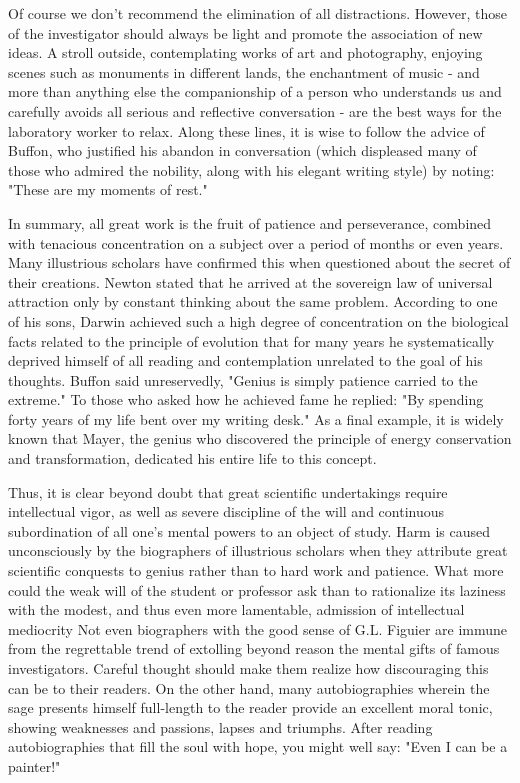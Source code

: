 \documentclass{article}
\begin{document}
Of course we don’t recommend the elimination of all distractions. However, those of the investigator should always be light and promote the association of new ideas. A stroll outside, contemplating works of art and photography, enjoying scenes such as monuments in different lands, the enchantment of music - and more than anything else the companionship of a person who understands us and carefully avoids all serious and reflective conversation - are the best ways for the laboratory worker to relax. Along these lines, it is wise to follow the advice of Buffon, who justified his abandon in conversation (which displeased many of those who admired the nobility, along with his elegant writing style) by noting: "These are my moments of rest."

In summary, all great work is the fruit of patience and perseverance, combined with tenacious concentration on a subject over a period of months or even years. Many illustrious scholars have confirmed this when questioned about the secret of their creations. Newton stated that he arrived at the sovereign law of universal attraction only by constant thinking about the same problem. According to one of his sons, Darwin achieved such a high degree of concentration on the biological facts related to the principle of evolution that for many years he systematically deprived himself of all reading and contemplation unrelated to the goal of his thoughts. Buffon said unreservedly, "Genius is simply patience carried to the extreme." To those who asked how he achieved fame he replied: "By spending forty years of my life bent over my writing desk." As a final example, it is widely known that Mayer, the genius who discovered the principle of energy conservation and transformation, dedicated his entire life to this concept.

Thus, it is clear beyond doubt that great scientific undertakings require intellectual vigor, as well as severe discipline of the will and continuous subordination of all one’s mental powers to an object of study. Harm is caused unconsciously by the biographers of illustrious scholars when they attribute great scientific conquests to genius rather than to hard work and patience. What more could the weak will of the student or professor ask than to rationalize its laziness with the modest, and thus even more lamentable, admission of intellectual mediocrity\! Not even biographers with the good sense of G.L. Figuier are immune from the regrettable trend of extolling beyond reason the mental gifts of famous investigators. Careful thought should make them realize how discouraging this can be to their readers. On the other hand, many autobiographies wherein the sage presents himself full-length to the reader provide an excellent moral tonic, showing weaknesses and passions, lapses and triumphs. After reading autobiographies that fill the soul with hope, you might well say: "Even I can be a painter!"
\end{document}

